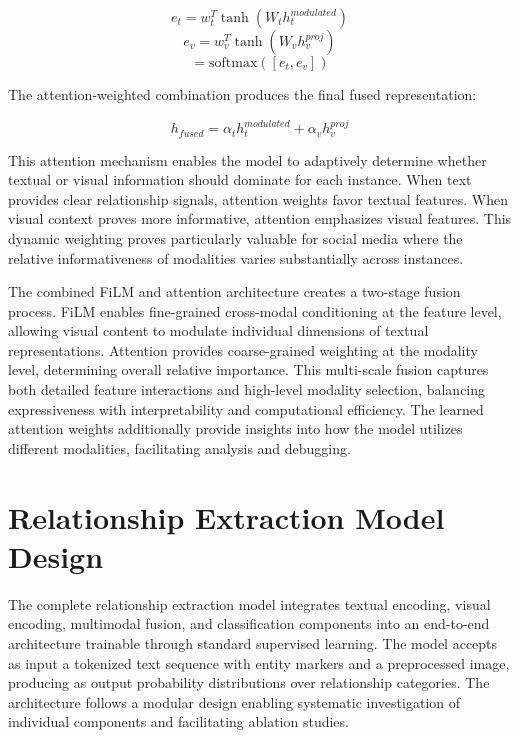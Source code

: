 \documentclass[12pt,a4paper]{report}
\begin{document}
\begin{equation}
e_t = w_t^T \tanh(W_t h_t^{modulated})
\end{equation}
\begin{equation}
e_v = w_v^T \tanh(W_v h_v^{proj})
\end{equation}
\begin{equation}
[\alpha_t, \alpha_v] = \text{softmax}([e_t, e_v])
\end{equation}

The attention-weighted combination produces the final fused representation:

\begin{equation}
h_{fused} = \alpha_t h_t^{modulated} + \alpha_v h_v^{proj}
\end{equation}

This attention mechanism enables the model to adaptively determine whether textual or visual information should dominate for each instance. When text provides clear relationship signals, attention weights favor textual features. When visual context proves more informative, attention emphasizes visual features. This dynamic weighting proves particularly valuable for social media where the relative informativeness of modalities varies substantially across instances.

The combined FiLM and attention architecture creates a two-stage fusion process. FiLM enables fine-grained cross-modal conditioning at the feature level, allowing visual content to modulate individual dimensions of textual representations. Attention provides coarse-grained weighting at the modality level, determining overall relative importance. This multi-scale fusion captures both detailed feature interactions and high-level modality selection, balancing expressiveness with interpretability and computational efficiency. The learned attention weights additionally provide insights into how the model utilizes different modalities, facilitating analysis and debugging.

\section{Relationship Extraction Model Design}

The complete relationship extraction model integrates textual encoding, visual encoding, multimodal fusion, and classification components into an end-to-end architecture trainable through standard supervised learning. The model accepts as input a tokenized text sequence with entity markers and a preprocessed image, producing as output probability distributions over relationship categories. The architecture follows a modular design enabling systematic investigation of individual components and facilitating ablation studies.
\end{document}
